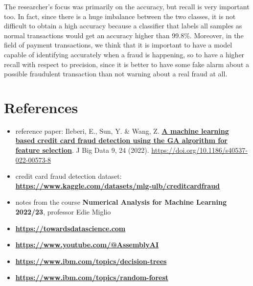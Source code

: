 \documentclass{Configuration_Files/PoliMi3i_thesis}
\begin{document}
The researcher's focus was primarily on the accuracy, but recall is very important too. In fact, since there is a huge imbalance between the two classes, it is not difficult to obtain a high accuracy because a classifier that labels all samples as normal transactions would get an accuracy higher than 99.8\%. Moreover, in the field of payment transactions, we think that it is important to have a model capable of identifying accurately when a fraud is happening, so to have a higher recall with respect to precision, since it is better to have some fake alarm about a possible fraudulent transaction than not warning about a real fraud at all.






\chapter{References}
\begin{itemize}
    \item reference paper: Ileberi, E., Sun, Y. \& Wang, Z. \href{https://journalofbigdata.springeropen.com/articles/10.1186/s40537-022-00573-8}{\textbf{A machine learning based credit card fraud detection using the GA algorithm for feature selection}}. J Big Data 9, 24 (2022). \href{https://doi.org/10.1186/s40537-022-00573-8 }{https://doi.org/10.1186/s40537-022-00573-8}
    \item credit card fraud detection dataset: \href{https://www.kaggle.com/datasets/mlg-ulb/creditcardfraud}{\textbf{https://www.kaggle.com/datasets/mlg-ulb/creditcardfraud}}
    \item notes from the course \textbf{Numerical Analysis for Machine Learning 2022/23}, professor Edie Miglio
    \item \href{https://towardsdatascience.com}{\textbf{https://towardsdatascience.com}}
     \item \href{https://www.youtube.com/@AssemblyAI}{\textbf{https://www.youtube.com/@AssemblyAI}}
    \item \href{https://www.ibm.com/topics/decision-trees}{\textbf{https://www.ibm.com/topics/decision-trees}}
    \item \href{https://www.ibm.com/topics/random-forest}{\textbf{https://www.ibm.com/topics/random-forest}}
   
\end{itemize}
\cleardoublepage
\end{document}
